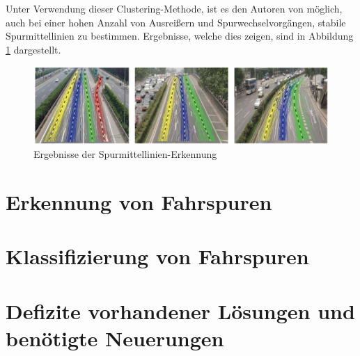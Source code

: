 Unter Verwendung dieser Clustering-Methode, ist es den Autoren von \cite[]{Ren2014} möglich, auch bei einer hohen Anzahl von
Ausreißern und Spurwechselvorgängen, stabile Spurmittellinien zu bestimmen. Ergebnisse, welche dies zeigen, sind in Abbildung
\ref{fig:relw_ren_example_detection} dargestellt.

\begin{figure}[H]
    \centering
    \includegraphics[width=0.9\linewidth]{../resources/img/RelatedWork/ren_examples_detection}
    \caption[Ergebnisse der Spurmittellinien-Erkennung (Ren et al.)]{Ergebnisse der Spurmittellinien-Erkennung \cite[]{Ren2014}}
    \label{fig:relw_ren_example_detection}
\end{figure}


\section{Erkennung von Fahrspuren}
\label{sec:rw_lane_detection}






\section{Klassifizierung von Fahrspuren}
\label{sec:rw_lane_classification}

\section{Defizite vorhandener Lösungen und benötigte Neuerungen}
\label{sec:rw_deficites}


